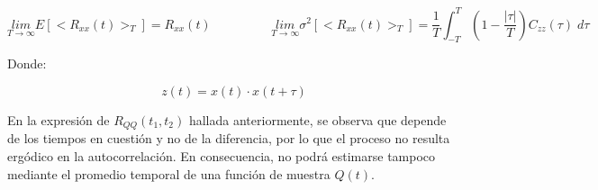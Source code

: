 \[
\underset{T \rightarrow \infty}{lim} E[<R_{xx}(t)>_T] = R_{xx}(t) \hspace{2cm} \underset{T \rightarrow \infty}{lim} \sigma^2[<R_{xx}(t)>_T] = \frac{1}{T} \int^{T}_{-T} \left( 1-\frac{|\tau|}{T} \right) C_{zz}(\tau) \; d\tau
\]
\par
Donde:

\[
z(t) = x(t) \cdot x(t+\tau) 
\]

En la expresi\'on de $R_{QQ}(t_1,t_2)$ hallada anteriormente, se observa que depende de los tiempos en cuesti\'on y no de la diferencia, por lo que el proceso no resulta erg\'odico en la autocorrelaci\'on. En consecuencia, no podr\'a estimarse tampoco mediante el promedio temporal de una funci\'on de muestra $Q(t)$.

